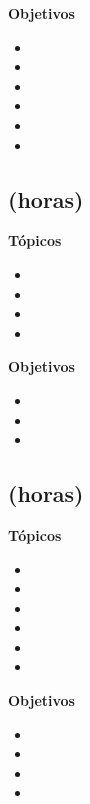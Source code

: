 \textbf{Objetivos}
\begin{itemize}
	\item \ARCINCOObjUNO
	\item \ARCINCOObjDOS
	\item \ARCINCOObjTRES
	\item \ARCINCOObjCUATRO
	\item \ARCINCOObjCINCO
	\item \ARCINCOObjSEIS
\end{itemize}

\subsection{\ARSEISDef  (\ARSEISHours horas)}\label{sec:BOK-AR6}

\textbf{Tópicos}
\begin{itemize}
	\item \ARSEISTopicImplementacion
	\item \ARSEISTopicUnidad
	\item \ARSEISTopicInstruccion
	\item \ARSEISTopicIntroduccion
\end{itemize}

\textbf{Objetivos}
\begin{itemize}
	\item \ARSEISObjUNO
	\item \ARSEISObjDOS
	\item \ARSEISObjTRES
\end{itemize}

\subsection{\ARSIETEDef  (\ARSIETEHours horas)}\label{sec:BOK-AR7}

\textbf{Tópicos}
\begin{itemize}
	\item \ARSIETETopicIntroduccion
	\item \ARSIETETopicArquitectura
	\item \ARSIETETopicInterconeccion
	\item \ARSIETETopicSistemas
	\item \ARSIETETopicCoherencia
	\item \ARSIETETopicModelos
\end{itemize}

\textbf{Objetivos}
\begin{itemize}
	\item \ARSIETEObjUNO
	\item \ARSIETEObjDOS
	\item \ARSIETEObjTRES
	\item \ARSIETEObjCUATRO
\end{itemize}

